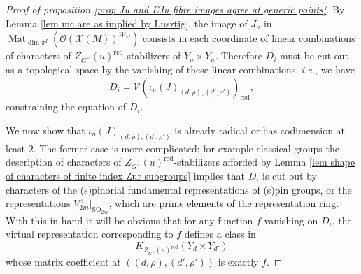 \documentclass[10pt]{article}
\DeclareMathOperator{\Mat}{Mat}
\newcommand{\X}{\mathcal{X}}
\newcommand{\Oo}{\mathcal{O}}
\newcommand{\SO}{\mathrm{SO}}
\theoremstyle{definition}
\theoremstyle{remark}
\newcommand{\Zur}{Z_{G^\vee}(u)^{\mathrm{red}}}
\begin{document}
\begin{proof}[Proof of proposition \ref{prop Ju and EJu fibre images agree at generic points}]
By Lemma \ref{lem mc are as implied by Lusztig}, the image of $J_u$ in 
$\Mat_{\dim\pi^I}(\Oo(\X(M))^{W_M})$ consists in each coordinate
of linear combinations of characters of $\Zur$-stabilizers of $Y_u\times Y_u$. Therefore
$D_i$ must be cut out as a topological space by the vanishing of these linear combinations, \textit{i.e.}, we have
%
\[
D_i=\mathcal{V}(\iota_u(J)_{(d,\rho), (d',\rho')})_{\mathrm{red}},
\]
%
constraining the equation of $D_i$. 

We now show that $\iota_u(J)_{(d,\rho), (d',\rho')}$ is already radical or has codimension at least $2$. The former case is more complicated; for example classical groups the description of characters of $\Zur$-stabilizers 
afforded by Lemma \ref{lem shape of characters of finite index Zur subgroups} implies that
$D_i$ is cut out by characters of the (s)pinorial fundamental representations of (s)pin groups, or the 
representations $V_{2m}^{\pm}|_{\SO_{2m}}$, which are prime elements of the representation ring. With this in hand it will be obvious that for any function $f$ vanishing on $D_i$, the virtual representation corresponding to $f$ defines
a class in
%
\[
K_{\Zur}(Y_{d}\times Y_{d'})
\]
%
whose matrix coefficient at $((d,\rho),(d',\rho'))$ is exactly $f$. 


\end{proof}
\end{document}
